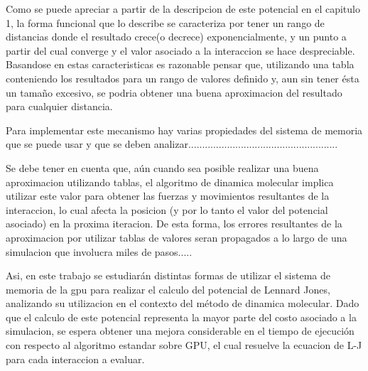 \documentclass[a4paper,10pt]{report}
\begin{document}



Como se puede apreciar a partir de la descripcion de este potencial en el capitulo 1, la forma funcional que lo describe se caracteriza por tener un rango de distancias donde el resultado crece(o decrece) exponencialmente, y un punto a partir del cual converge y el valor asociado a la interaccion se hace despreciable.
Basandose en estas caracteristicas es razonable pensar que, utilizando una tabla conteniendo los resultados para un rango de valores definido y, aun sin tener ésta un tamaño excesivo, se podria obtener una buena aproximacion del resultado para cualquier distancia. 



Para implementar este mecanismo hay varias propiedades del sistema de memoria que se puede usar y que se deben analizar......................................................




Se debe tener en cuenta que, aún cuando sea posible realizar una buena aproximacion utilizando tablas, el algoritmo de dinamica molecular implica utilizar este valor para obtener las fuerzas y movimientos resultantes de la interaccion, lo cual afecta la posicion (y por lo tanto el valor del potencial asociado) en la proxima iteracion. De esta forma, los errores resultantes de la aproximacion por utilizar tablas de valores seran propagados a lo largo de una simulacion que involucra miles de pasos.....



Asi, en este trabajo se estudiarán distintas formas de utilizar el sistema de memoria de la gpu para realizar el calculo del potencial de Lennard Jones, analizando su utilizacion en el contexto del método de dinamica molecular. Dado que el calculo de este potencial representa la mayor parte del costo asociado a la simulacion, se espera obtener una mejora considerable en el tiempo de ejecución con respecto al algoritmo estandar sobre GPU, el cual resuelve la ecuacion de L-J para cada interaccion a evaluar.
\end{document}
